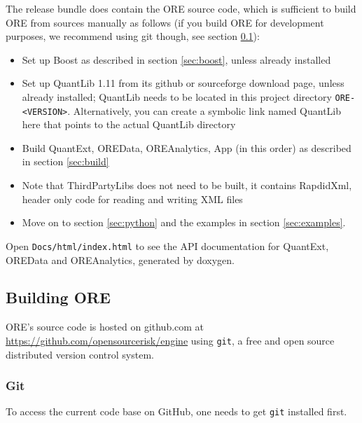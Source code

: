 \documentclass[12pt, a4paper]{article}
\begin{document}
\medskip
The release bundle does contain the ORE source code, which is sufficient to build ORE from sources manually as follows (if you build ORE for development purposes, we recommend using git though, see section \ref{sec:build_ore}):
\begin{itemize}
\item Set up Boost as described in section \ref{sec:boost}, unless already installed
\item Set up QuantLib 1.11 \cite{QL,quantlib-install} from its github or sourceforge download page, unless already
  installed; QuantLib needs to be located in this project directory {\tt ORE-<VERSION>}. Alternatively, you can create a
  symbolic link named QuantLib here that points to the actual QuantLib directory
\item Build QuantExt, OREData, OREAnalytics, App (in this order) as described in section \ref{sec:build}
\item Note that ThirdPartyLibs does not need to be built, it contains RapdidXml, header only code for reading and
  writing XML files
\item Move on to section \ref{sec:python} and the examples in section \ref{sec:examples}.
\end{itemize}

Open {\tt Docs/html/index.html} to see the API documentation for QuantExt, OREData and OREAnalytics, generated by
doxygen.

\subsection{Building ORE}\label{sec:build_ore}

ORE's source code is hosted on github.com at \url{https://github.com/opensourcerisk/engine} using {\tt git}, a free and
open source distributed version control system.

\subsubsection{Git}

To access the current code base on GitHub, one needs to get {\tt git} installed first.
   
\end{document}
